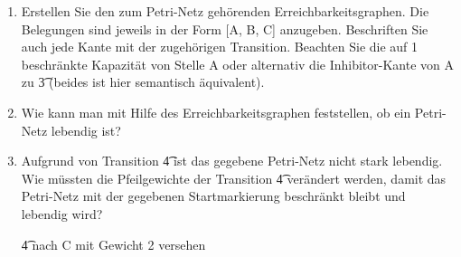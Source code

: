 \documentclass{lehramt-informatik-aufgabe}
\begin{document}
\begin{enumerate}


\item Erstellen Sie den zum Petri-Netz gehörenden
Erreichbarkeitsgraphen. Die Belegungen sind
jeweils in der Form [A, B, C] anzugeben. Beschriften Sie auch jede Kante
mit der zugehörigen Transition. Beachten Sie die auf 1 beschränkte
Kapazität von Stelle A oder alternativ die Inhibitor-Kante von A zu
\t3 (beides ist hier semantisch äquivalent).



\item Wie kann man mit Hilfe des Erreichbarkeitsgraphen feststellen, ob
ein Petri-Netz lebendig ist?


\item Aufgrund von Transition \t4 ist das gegebene Petri-Netz nicht
stark lebendig. Wie müssten die Pfeilgewichte der Transition \t4
verändert werden, damit das Petri-Netz mit der gegebenen Startmarkierung
beschränkt bleibt und lebendig wird?

\begin{liAntwort}
\t4 nach C mit Gewicht 2 versehen
\end{liAntwort}

\end{enumerate}
\end{document}
